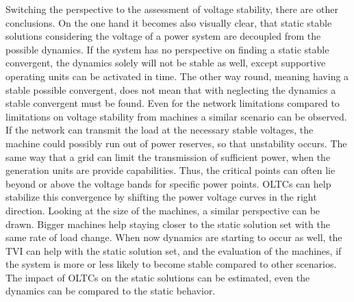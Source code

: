 Switching the perspective to the assessment of voltage stability, there are other conclusions.
On the one hand it becomes also visually clear, that static stable solutions considering the voltage of a power system are decoupled from the possible dynamics.
If the system has no perspective on finding a static stable convergent, the dynamics solely will not be stable as well, except supportive operating units can be activated in time.
The other way round, meaning having a stable possible convergent, does not mean that with neglecting the dynamics a stable convergent must be found.
Even for the network limitations compared to limitations on voltage stability from machines a similar scenario can be observed.
If the network can transmit the load at the necessary stable voltages, the machine could possibly run out of power reserves, so that unstability occurs.
The same way that a grid can limit the transmission of sufficient power, when the generation units are provide capabilities.
Thus, the critical points can often lie beyond or above the voltage bands for specific power points. \acsp{OLTC} can help stabilize this convergence by shifting the power voltage curves in the right direction.
Looking at the size of the machines, a similar perspective can be drawn. 
Bigger machines help staying closer to the static solution set with the same rate of load change.
When now dynamics are starting to occur as well, the \acs{TVI} can help with the static solution set, and the evaluation of the machines, if the system is more or less likely to become stable compared to other scenarios.
The impact of \acsp{OLTC} on the static solutions can be estimated, even the dynamics can be compared to the static behavior.


